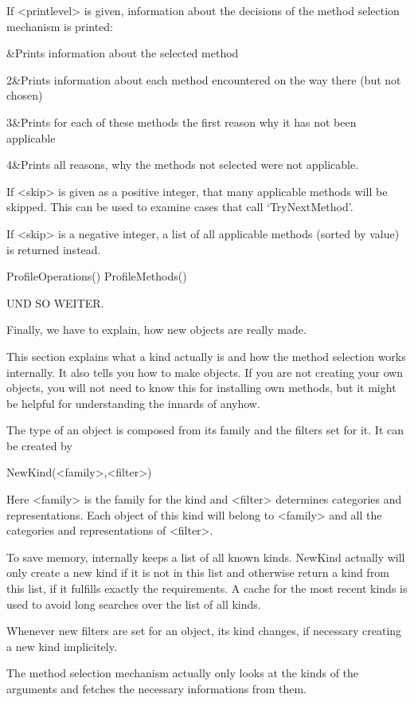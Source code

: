 If <printlevel> is given, information about
the decisions of the method selection mechanism is printed:

&Prints information about the selected method

2&Prints information about each method encountered on the way there (but not
chosen)

3&Prints for each of these methods the first reason why it has not been
applicable

4&Prints all reasons, why the methods not selected were not applicable.
\enditems

If <skip> is given as a positive integer, that many applicable  methods will
be skipped. This can be used to examine cases that call `TryNextMethod'.

If <skip> is a negative integer, a list of all applicable methods (sorted by
value) is returned instead.

\>ProfileOperations()
\>ProfileMethods()

UND SO WEITER.



Finally, we have to explain, how new objects are really made.

This section explains what a kind actually is and how the method selection
works internally. It also tells you how to make objects.
If you are not creating your own objects, you will not need to know this
for installing own methods, but it might be helpful for understanding the
innards of {\GAP} anyhow.

The type of an object is composed from its family and the filters set for
it. It can be created by

\>NewKind(<family>,<filter>)

Here <family> is the family for the kind and <filter> determines categories
and representations. Each object of this kind will belong to <family> and
all the categories and representations of <filter>.

\danger
To save memory,
{\GAP} internally keeps a list of all known kinds. NewKind actually will
only create a new kind if it is not in this list and otherwise return a
kind from
this list, if it fulfills exactly the requirements. A cache for the most
recent kinds is used to avoid long searches over the list of all kinds.

Whenever new filters are set for an object, its kind changes, if necessary
creating a new kind implicitely.

The method selection mechanism actually only looks at the kinds of the
arguments and fetches the necessary informations from them.

